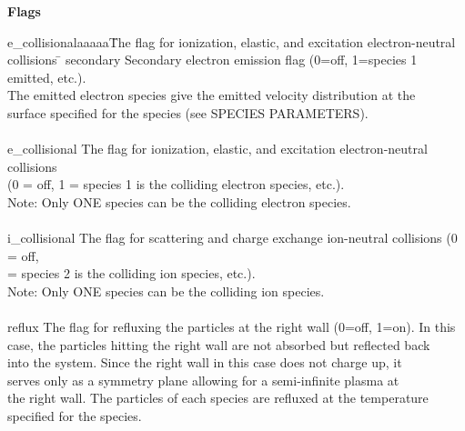 \begin{section}
\begin{subsection}
\begin{subsubsection}
{\bf Flags}

\begin{tabbing}
      e\_collisionalaaaaa\= The flag for ionization, elastic, and excitation
                    electron-neutral collisions \= \kill
      secondary \>  Secondary electron emission flag (0=off, 1=species 1
                    emitted, etc.).  \> \\
		\>    The emitted electron species give the
                    emitted velocity distribution at the \> \\
		\>    surface specified for
                    the species (see SPECIES PARAMETERS). \> \\
							\\
      e\_collisional \> The flag for ionization, elastic, and excitation
                    electron-neutral collisions \> \\
		\>  (0 = off, 1 = species 1 is the
                    colliding electron species, etc.). \> \\
                \>  Note: Only ONE species can be the colliding electron
                    species. \> \\
								\\
      i\_collisional \> The flag for scattering and charge exchange ion-neutral
                    collisions (0 = off, \> \\
		 = species 2 is the colliding ion
                    species, etc.). \> \\
                \>  Note: Only ONE species can be the colliding ion species. \> \\
						\\
      reflux    \>  The flag for refluxing the particles at the right wall
                    (0=off, 1=on).  In this \> \\
		\>  case, the particles hitting the
                    right wall are not absorbed but reflected back  \> \\
		\>  into the
                    system.  Since the right wall in this case does not charge
                    up, it  \> \\
		\>  serves only as a symmetry plane allowing for a
                    semi-infinite plasma at \> \\
		\>  the right wall.  The particles of
                    each species are refluxed at the temperature \> \\
		\>  specified for
                    the species. \> \\

\end{tabbing}
\end{subsubsection}
\end{subsection}
\end{section}
